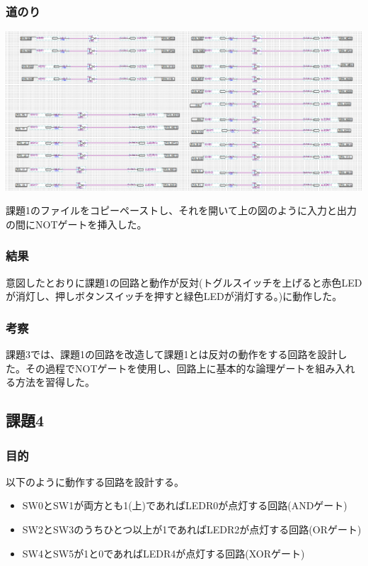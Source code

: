 \documentclass[a4paper]{jarticle}
\begin{document}
\subsubsection{道のり}
\begin{center}
	\includegraphics[width=15cm]{work3.PNG}
\end{center}
課題1のファイルをコピーペーストし、それを開いて上の図のように入力と出力の間にNOTゲートを挿入した。
\subsubsection{結果}
意図したとおりに課題1の回路と動作が反対(トグルスイッチを上げると赤色LEDが消灯し、押しボタンスイッチを押すと緑色LEDが消灯する。)に動作した。
\subsubsection{考察}
課題3では、課題1の回路を改造して課題1とは反対の動作をする回路を設計した。その過程でNOTゲートを使用し、回路上に基本的な論理ゲートを組み入れる方法を習得した。
\subsection{課題4}
\subsubsection{目的}
以下のように動作する回路を設計する。
\begin{itemize}
	\item SW0とSW1が両方とも1(上)であればLEDR0が点灯する回路(ANDゲート)
	\item SW2とSW3のうちひとつ以上が1であればLEDR2が点灯する回路(ORゲート)
	\item SW4とSW5が1と0であればLEDR4が点灯する回路(XORゲート)
\end{itemize}
\end{document}
